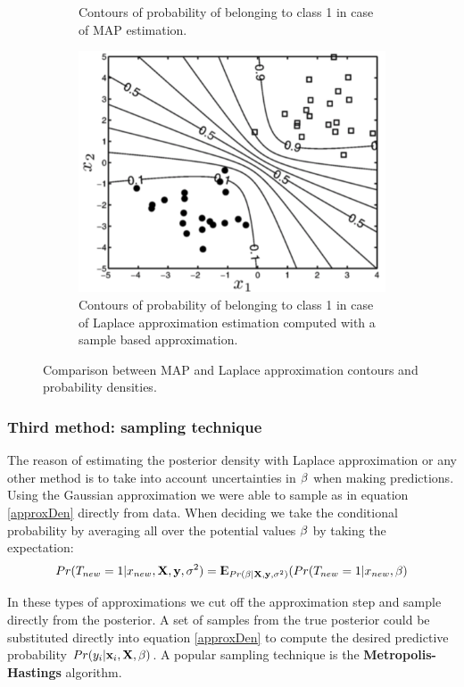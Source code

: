 \begin{figure}
\begin{subfigure}[t]{0.5\textwidth}
\caption{Contours of probability of belonging to class 1 in case of MAP estimation.}
\label{MAP2}
\end{subfigure}
\hfill
\begin{subfigure}[t]{0.5\textwidth}
\centering
\includegraphics[width=0.8\linewidth]{img/laplace2}
\caption{Contours of probability of belonging to class 1 in case of Laplace approximation estimation computed with a sample based approximation.}
\label{laplace2}
\end{subfigure}
\caption{Comparison between MAP and Laplace approximation contours and probability densities.}
\end{figure}

\subsubsection{Third method: sampling technique	}
The reason of estimating the posterior density with Laplace approximation or any other method is to take into account uncertainties in $\mathbf{\beta}$ when making predictions. Using the Gaussian approximation we were able to sample as in equation \autoref{approxDen} directly from data. When deciding we take the conditional probability by averaging all over the potential values $\mathbf{\beta}$ by taking the expectation:
\begin{equation}
Pr(T_{new}=1| x_{new}, \X, \y, \sigma^2) = \E_{Pr(\be|\X, \y, \sigma^2)}\br{Pr(T_{new}=1|x_{new},\be}
\end{equation}

In these types of approximations we cut off the approximation step and sample directly from the posterior. A set of samples from the true posterior could be substituted directly into equation \autoref{approxDen} to compute the desired predictive probability $Pr(y_i|\mathbf{x}_i, \mathrm{\mathbf{X}}, \mathbf{\beta})$. A popular sampling technique is the \textbf{Metropolis-Hastings} algorithm.

